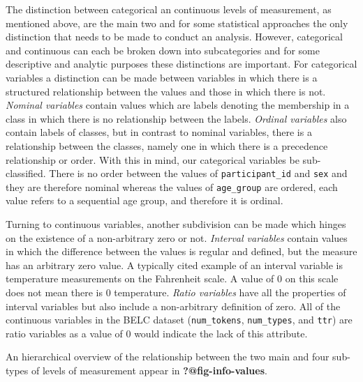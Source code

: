 \documentclass[
  letterpaper,
]{latex/krantz}
\begin{document}
The distinction between categorical an continuous levels of measurement,
as mentioned above, are the main two and for some statistical approaches
the only distinction that needs to be made to conduct an analysis.
However, categorical and continuous can each be broken down into
subcategories and for some descriptive and analytic purposes these
distinctions are important. For categorical variables a distinction can
be made between variables in which there is a structured relationship
between the values and those in which there is not. \emph{Nominal
variables} contain values which are labels denoting the membership in a
class in which there is no relationship between the labels.
\emph{Ordinal variables} also contain labels of classes, but in contrast
to nominal variables, there is a relationship between the classes,
namely one in which there is a precedence relationship or order. With
this in mind, our categorical variables be sub-classified. There is no
order between the values of \texttt{participant\_id} and \texttt{sex}
and they are therefore nominal whereas the values of \texttt{age\_group}
are ordered, each value refers to a sequential age group, and therefore
it is ordinal.

Turning to continuous variables, another subdivision can be made which
hinges on the existence of a non-arbitrary zero or not. \emph{Interval
variables} contain values in which the difference between the values is
regular and defined, but the measure has an arbitrary zero value. A
typically cited example of an interval variable is temperature
measurements on the Fahrenheit scale. A value of 0 on this scale does
not mean there is 0 temperature. \emph{Ratio variables} have all the
properties of interval variables but also include a non-arbitrary
definition of zero. All of the continuous variables in the BELC dataset
(\texttt{num\_tokens}, \texttt{num\_types}, and \texttt{ttr}) are ratio
variables as a value of 0 would indicate the lack of this attribute.

An hierarchical overview of the relationship between the two main and
four sub-types of levels of measurement appear in
\textbf{?@fig-info-values}.
\end{document}
